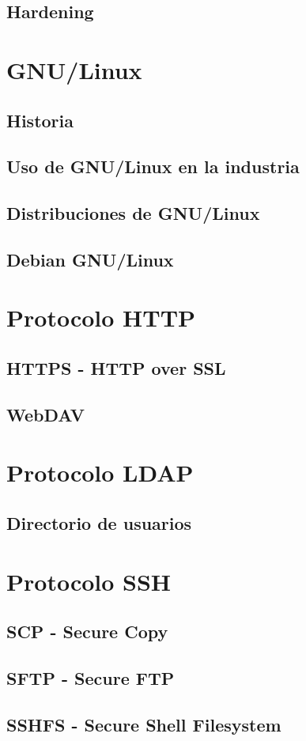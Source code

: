       \subsection {Hardening}
    \section {GNU/Linux}
      \subsection {Historia}
      \subsection {Uso de GNU/Linux en la industria}
      \subsection {Distribuciones de GNU/Linux}
      \subsection {Debian GNU/Linux}
    \section {Protocolo HTTP}
      \subsection {HTTPS - HTTP over SSL}
      \subsection {WebDAV}
    \section {Protocolo LDAP}
      \subsection {Directorio de usuarios}
    \section {Protocolo SSH}
      \subsection {SCP - Secure Copy}
      \subsection {SFTP - Secure FTP}
      \subsection {SSHFS - Secure Shell Filesystem}
